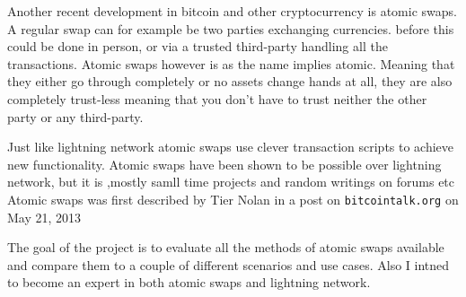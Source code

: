 Another recent development in bitcoin and other cryptocurrency is atomic swaps. A regular swap can for example be two parties exchanging currencies. before this could be done in person, or via a trusted third-party handling all the transactions. Atomic swaps however is as the name implies atomic. Meaning that they either go through completely or no assets change hands at all, they are also completely trust-less meaning that you don't have to trust neither the other party or any third-party.

Just like lightning network atomic swaps use clever transaction scripts to achieve new functionality. Atomic swaps have been shown to be possible over lightning network, but it is ,mostly samll time projects and random writings on forums etc
Atomic swaps was first described by Tier Nolan in a post on \texttt{bitcointalk.org} on May 21, 2013


The goal of the project is to evaluate all the methods of atomic swaps available and compare them to a couple of different scenarios and use cases. Also I intned to become an expert in both atomic swaps and lightning network. 

